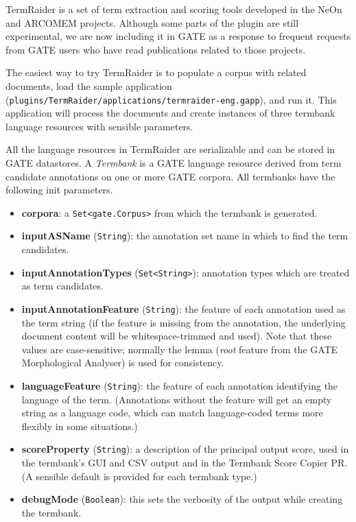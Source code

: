 TermRaider is a set of term extraction and scoring tools developed in the NeOn
and ARCOMEM projects.  Although some parts of the plugin are still experimental,
we are now including it in GATE as a response to frequent requests from GATE
users who have read publications related to those projects.

The easiest way to try TermRaider is to populate a corpus with related
documents, load the sample application
(\texttt{plugins/TermRaider/applications/termraider-eng.gapp}), and run it.
This application will process the documents and create instances of three
termbank language resources with sensible parameters.

All the language resources in TermRaider are serializable and can be stored in
GATE datastores.
A \emph{Termbank} is a GATE language resource derived from term candidate
annotations on one or more GATE corpora.  All termbanks have the following init
parameters.
\begin{itemize}
\item \textbf{corpora}: a \texttt{Set<gate.Corpus>} from which the termbank is
  generated.
\item \textbf{inputASName} (\texttt{String}): the annotation set name in which
  to find the term candidates.
\item \textbf{inputAnnotationTypes} (\texttt{Set<String>}): annotation types
  which are treated as term candidates.
\item \textbf{inputAnnotationFeature} (\texttt{String}): the feature of each
  annotation used as the term string (if the feature is missing from the
  annotation, the underlying document content will be whitespace-trimmed and
  used).  Note that these values are case-sensitive; normally the lemma
  (\emph{root} feature from the GATE Morphological Analyser) is used for
  consistency.
\item \textbf{languageFeature} (\texttt{String}): the feature of each annotation
  identifying the language of the term.  (Annotations without the feature will
  get an empty string as a language code, which can match language-coded terms
  more flexibly in some situations.)
\item \textbf{scoreProperty} (\texttt{String}): a description of the principal
  output score, used in the termbank's GUI and CSV output and in the Termbank
  Score Copier PR.  (A sensible default is provided for each termbank type.)
\item \textbf{debugMode} (\texttt{Boolean}): this sets the verbosity of the
  output while creating the termbank.
\end{itemize}


